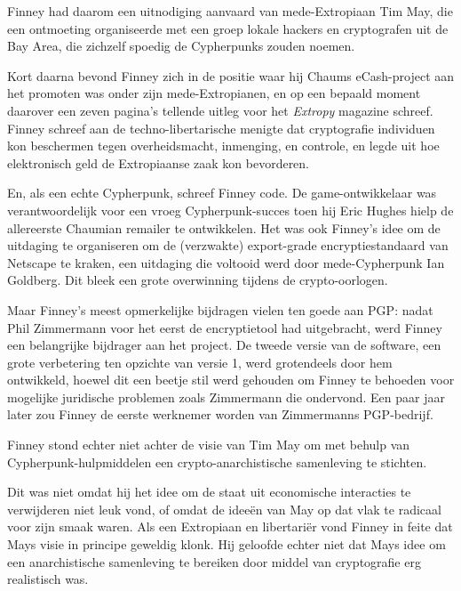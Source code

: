 \documentclass[
  a5paper,
  smalldemyvopaper,11pt,twoside,onecolumn,openright,extrafontsizes,
hidelinks]{memoir}
\begin{document}
Finney had daarom een uitnodiging aanvaard van mede-Extropiaan Tim May,
die een ontmoeting organiseerde met een groep lokale hackers en
cryptografen uit de Bay Area, die zichzelf spoedig de Cypherpunks zouden
noemen.

Kort daarna bevond Finney zich in de positie waar hij Chaums
eCash-project aan het promoten was onder zijn mede-Extropianen, en op
een bepaald moment daarover een zeven pagina's tellende uitleg voor het
\emph{Extropy} magazine schreef. Finney schreef aan de
techno-libertarische menigte dat cryptografie individuen kon beschermen
tegen overheidsmacht, inmenging, en controle, en legde uit hoe
elektronisch geld de Extropiaanse zaak kon bevorderen.

En, als een echte Cypherpunk, schreef Finney code. De game-ontwikkelaar
was verantwoordelijk voor een vroeg Cypherpunk-succes toen hij Eric
Hughes hielp de allereerste Chaumian remailer te ontwikkelen. Het was
ook Finney's idee om de uitdaging te organiseren om de (verzwakte)
export-grade encryptiestandaard van Netscape te kraken, een uitdaging
die voltooid werd door mede-Cypherpunk Ian Goldberg. Dit bleek een grote
overwinning tijdens de crypto-oorlogen.

Maar Finney's meest opmerkelijke bijdragen vielen ten goede aan PGP:
nadat Phil Zimmermann voor het eerst de encryptietool had uitgebracht,
werd Finney een belangrijke bijdrager aan het project. De tweede versie
van de software, een grote verbetering ten opzichte van versie 1, werd
grotendeels door hem ontwikkeld, hoewel dit een beetje stil werd
gehouden om Finney te behoeden voor mogelijke juridische problemen zoals
Zimmermann die ondervond. Een paar jaar later zou Finney de eerste
werknemer worden van Zimmermanns PGP-bedrijf.

Finney stond echter niet achter de visie van Tim May om met behulp van
Cypherpunk-hulpmiddelen een crypto-anarchistische samenleving te
stichten.

Dit was niet omdat hij het idee om de staat uit economische interacties
te verwijderen niet leuk vond, of omdat de ideeën van May op dat vlak te
radicaal voor zijn smaak waren. Als een Extropiaan en libertariër vond
Finney in feite dat Mays visie in principe geweldig klonk. Hij geloofde
echter niet dat Mays idee om een anarchistische samenleving te bereiken
door middel van cryptografie erg realistisch was.
\end{document}
